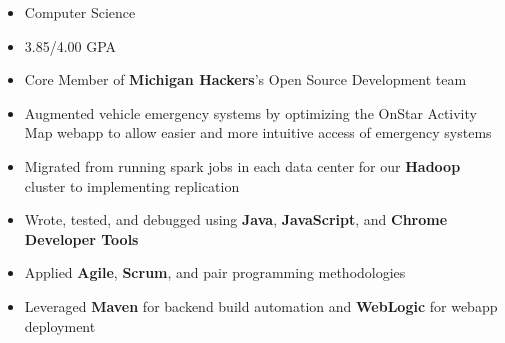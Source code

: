 \documentclass[10pt,a4paper,ragged2e]{altacv}
\begin{document}
\tagline{}

\begin{fullwidth}
\makecvheader
\end{fullwidth}



\begin{itemize}
    \item Computer Science
    \smallskip
    \item 3.85/4.00 GPA
    \smallskip
    \item Core Member of \textbf{Michigan Hackers}'s Open Source Development team
\end{itemize}



\begin{itemize}
\item Augmented vehicle emergency systems by optimizing the OnStar Activity Map webapp to allow easier and more intuitive access of emergency systems
\smallskip
\item Migrated from running spark jobs in each data center for our \textbf{Hadoop} cluster to implementing replication
\smallskip
\item Wrote, tested, and debugged using \textbf{Java}, \textbf{JavaScript}, and \textbf{Chrome Developer Tools}
\smallskip
\item Applied \textbf{Agile}, \textbf{Scrum}, and pair programming methodologies
\smallskip
\item Leveraged \textbf{Maven} for backend build automation and \textbf{WebLogic} for webapp deployment
\end{itemize}
\end{document}
